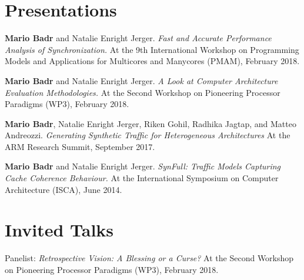 \section{\sc Presentations}

\onecol
{
  \textbf{Mario Badr} and Natalie Enright Jerger.
  \textit{Fast and Accurate Performance Analysis of Synchronization.}
  At the 9th International Workshop on Programming Models and Applications for Multicores and Manycores (PMAM), February 2018.
}

\onecol
{
  \textbf{Mario Badr} and Natalie Enright Jerger.
  \textit{A Look at Computer Architecture Evaluation Methodologies.}
  At the Second Workshop on Pioneering Processor Paradigms (WP3), February 2018.
}

\onecol
{
  \textbf{Mario Badr}, Natalie Enright Jerger, Riken Gohil, Radhika Jagtap, and Matteo Andreozzi.
  \textit{Generating Synthetic Traffic for Heterogeneous Architectures}
  At the ARM Research Summit, September 2017.
}

\onecol
{
  \textbf{Mario Badr} and Natalie Enright Jerger.
  \textit{SynFull: Traffic Models Capturing Cache Coherence Behaviour.}
  At the International Symposium on Computer Architecture (ISCA), June 2014.
}

\section{\sc Invited Talks}

\onecol
{
  Panelist: \textit{Retrospective Vision: A Blessing or a Curse?}
  At the Second Workshop on Pioneering Processor Paradigms (WP3), February 2018.
}

